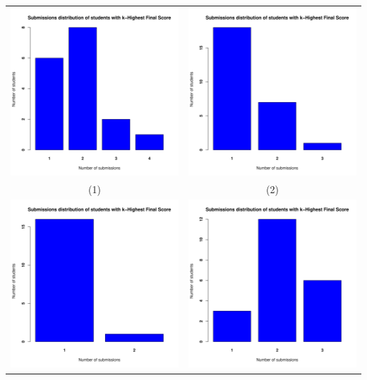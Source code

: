\documentclass[a4paper]{article}
\theoremstyle{definition}
\begin{document}
\begin{enumerate}[a)]
\begin{itemize}
\begin{center}
\begin{tabular}{c c}
                 \includegraphics[width = 6.9cm]{Images/img2-7-1.png} & \includegraphics[width = 6.9cm]{Images/img2-7-2.png} \\
                 (1) & (2) \\
                 \includegraphics[width = 6.9cm]{Images/img2-7-3.png} &
                 \includegraphics[width = 6.9cm]{Images/img2-7-4.png} \\

\end{tabular}
\end{center}
\end{itemize}
\end{enumerate}
\end{document}
